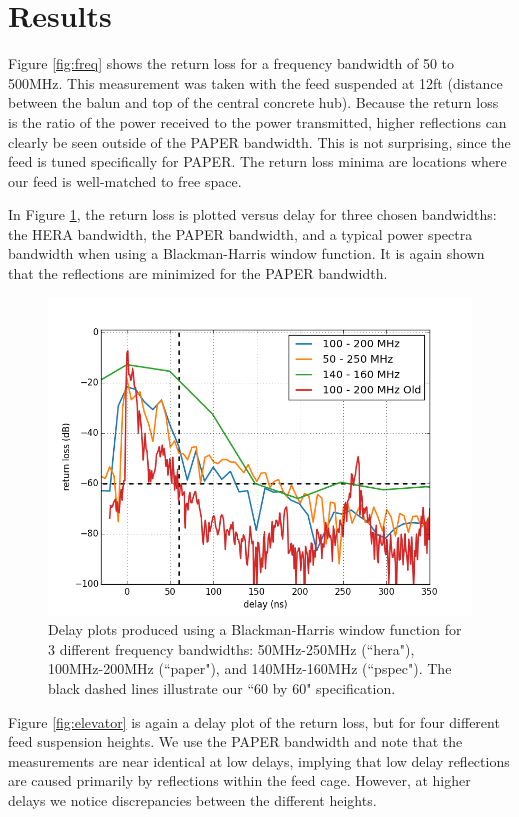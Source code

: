 \documentclass[12pt,preprint]{aastex}
\begin{document}
\section{Results}

Figure \ref{fig:freq} shows the return loss for a frequency bandwidth of 50 to 500MHz. This measurement was taken with the feed suspended at 12ft (distance between the balun and top of the central concrete hub). Because the return loss is the ratio of the power received to the power transmitted, higher reflections can clearly be seen outside of the PAPER bandwidth. This is not surprising, since the feed is tuned specifically for PAPER. The return loss minima are locations where our feed is well-matched to free space.

In Figure \ref{fig:3bands}, the return loss is plotted versus delay for three chosen bandwidths: the HERA bandwidth, the PAPER bandwidth, and a typical power spectra bandwidth when using a Blackman-Harris window function. It is again shown that the reflections are minimized for the PAPER bandwidth. 

\begin{figure}
\centering
\includegraphics[totalheight=0.4\textheight]{plots/delay3_window.png}
\caption{Delay plots produced using a Blackman-Harris window function for 3 different frequency bandwidths: 50MHz-250MHz (``hera"), 100MHz-200MHz (``paper"), and 140MHz-160MHz (``pspec"). The black dashed lines illustrate our ``60 by 60" specification.}
\label{fig:3bands}
\end{figure}

Figure \ref{fig:elevator} is again a delay plot of the return loss, but for four different feed suspension heights. We use the PAPER bandwidth and note that the measurements are near identical at low delays, implying that low delay reflections are caused primarily by reflections within the feed cage. However, at higher delays we notice discrepancies between the different heights.
\end{document}
